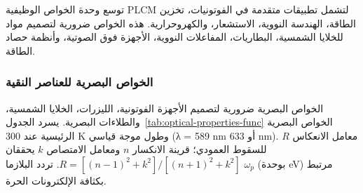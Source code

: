 \documentclass[11pt,a4paper]{article}
\begin{document}
\begin{otherlanguage}{arabic}
		توسع وحدة الخواص الوظيفية PLCM لتشمل تطبيقات متقدمة في الفوتونيات، تخزين الطاقة، الهندسة النووية، الاستشعار، والكهروحرارية. هذه الخواص ضرورية لتصميم مواد للخلايا الشمسية، البطاريات، المفاعلات النووية، الأجهزة فوق الصوتية، وأنظمة حصاد الطاقة.
		
		\subsubsection{الخواص البصرية للعناصر النقية}
		\label{subsec:optical-properties}
		
		الخواص البصرية ضرورية لتصميم الأجهزة الفوتونية، الليزرات، الخلايا الشمسية، والطلاءات البصرية. يسرد الجدول~\ref{tab:optical-properties-func} الخواص البصرية الرئيسية عند 300 K وطول موجة قياسي (λ = 589 nm أو 633 nm). معامل الانعكاس \(R\) للسقوط العمودي؛ قرينة الانكسار \(n\) ومعامل الامتصاص \(k\) يحققان \(R = [(n-1)^2 + k^2]/[(n+1)^2 + k^2]\). تردد البلازما \(\omega_p\) (بوحدة eV) مرتبط بكثافة الإلكترونات الحرة.
		

\end{otherlanguage}
\end{document}
